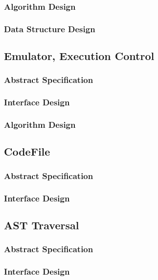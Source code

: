 \documentclass{report}
\begin{document}
    \subsubsection{Algorithm Design}
    \subsubsection{Data Structure Design}

\subsection{Emulator, Execution Control}
    \subsubsection{Abstract Specification}
    \subsubsection{Interface Design}
    \subsubsection{Algorithm Design}

\subsection{CodeFile}
    \subsubsection{Abstract Specification}
    \subsubsection{Interface Design}
    \subsubsection{}

\subsection{AST Traversal}
    \subsubsection{Abstract Specification}
    \subsubsection{Interface Design}
\end{document}

